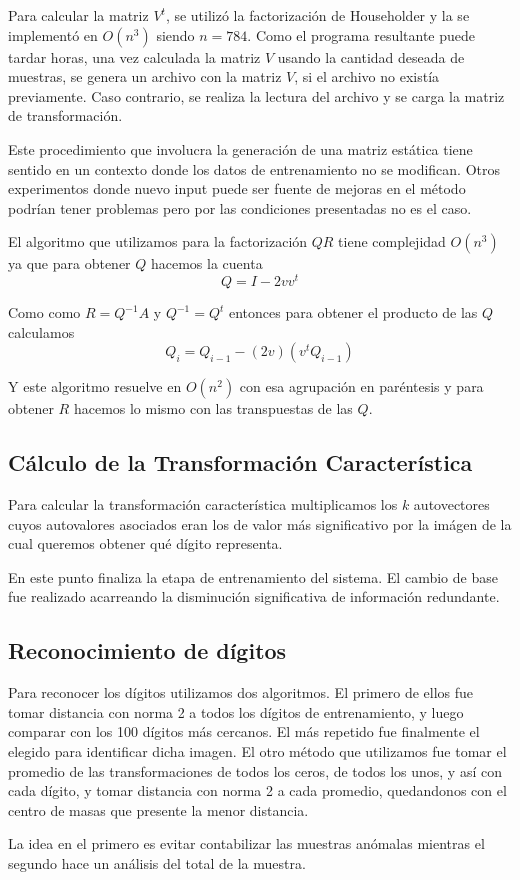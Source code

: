 Para calcular la matriz $V^t$, se utiliz\'o la factorizaci\'on de Householder y la se implement\'o en $O(n^3)$
siendo $n = 784$. Como el programa resultante puede tardar horas, una vez calculada la matriz $V$ usando la cantidad deseada
de muestras, se genera un archivo con la matriz $V$, si el archivo no exist\'ia previamente.
Caso contrario, se realiza la lectura del archivo y se carga la matriz de transformaci\'on.

Este procedimiento que involucra la generaci\'on de una matriz est\'atica tiene sentido en un contexto
donde los datos de entrenamiento no se modifican. Otros experimentos donde nuevo input puede ser fuente de mejoras
en el m\'etodo podr\'ian tener problemas pero por las condiciones presentadas no es el caso.

El algoritmo que utilizamos para la factorizaci\'on $QR$ tiene complejidad $O(n^3)$ ya que para obtener $Q$ hacemos la cuenta
$$Q = I - 2vv^t$$

Como como $R = Q^{-1}A$ y $Q^{-1} = Q^t$ entonces para obtener el producto de
las $Q$ calculamos
$$Q_i = Q_{i-1} - (2v)(v^t Q_{i-1})$$

Y este algoritmo resuelve en $O(n^2)$ con esa agrupaci\'on en par\'entesis y para
obtener $R$ hacemos lo mismo con las transpuestas de las $Q$.

\subsection{C\'alculo de la Transformaci\'on Caracter\'istica}

Para calcular la transformaci\'on caracter\'istica multiplicamos los $k$
autovectores cuyos autovalores asociados eran los de valor m\'as significativo
por la im\'agen de la cual queremos obtener qu\'e d\'igito representa.

En este punto finaliza la etapa de entrenamiento del sistema. El cambio de base
fue realizado acarreando la disminuci\'on significativa de informaci\'on
redundante.

\subsection{Reconocimiento de d\'igitos}
Para reconocer los d\'igitos utilizamos dos algoritmos. El primero de ellos fue tomar distancia con norma 2 a
todos los d\'igitos de entrenamiento, y luego comparar con los 100 d\'igitos m\'as cercanos. El m\'as repetido fue finalmente
el elegido para identificar dicha imagen. El otro m\'etodo que utilizamos fue tomar el promedio de las transformaciones
de todos los ceros, de todos los unos, y as\'i con cada d\'igito, y tomar distancia con norma 2
a cada promedio, quedandonos con el centro de masas que presente la menor distancia. 

La idea en el primero es evitar contabilizar las muestras an\'omalas mientras el
segundo hace un an\'alisis del total de la muestra.


